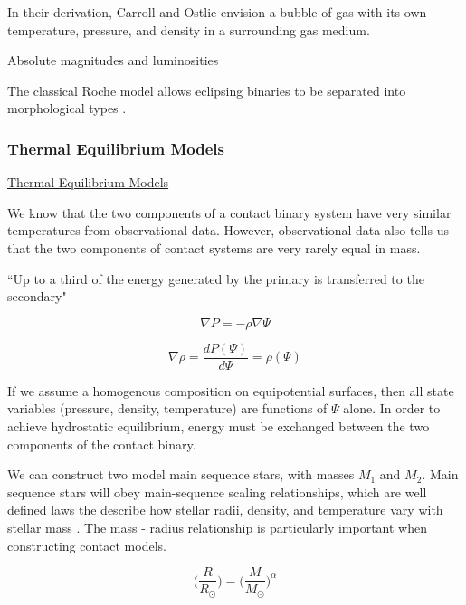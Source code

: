 \documentclass[12pt]{article} %
\numberwithin{equation}{section} %
\begin{document}
In their derivation, Carroll and Ostlie envision a bubble of gas with its own temperature, pressure, and density in a surrounding gas medium. 

Absolute magnitudes and luminosities \citep{rucinski1997absolute} \citep{rucinski2006luminosity}

The classical Roche model allows eclipsing binaries to be separated into morphological types \citep{terrell2001eclipsing}.


\subsubsection{Thermal Equilibrium Models}{\hyperlink{toc}{Thermal Equilibrium Models}} \label{sec: Thermal Equilibrium Models}

We know that the two components of a contact binary system have very similar temperatures from observational data. However, observational data also tells us that the two components of contact systems are very rarely equal in mass.

``Up to a third of the energy generated by the primary is transferred to the secondary"\citep{mochnacki1981contact}

\begin{equation} \label{eqn: equilibrium1}
\nabla P = - \rho \nabla \Psi
\end{equation}

\begin{equation} \label{eqn: equilibrium2}
\nabla \rho = \frac{dP(\Psi)}{d\Psi} = \rho(\Psi)
\end{equation}

If we assume a homogenous composition on equipotential surfaces, then all state variables (pressure, density, temperature) are functions of $\Psi$ alone. In order to achieve hydrostatic equilibrium, energy must be exchanged between the two components of the contact binary.

We can construct two model main sequence stars, with masses $M_{1}$ and $M_{2}$. Main sequence stars will obey main-sequence scaling relationships, which are well defined laws the describe how stellar radii, density, and temperature vary with stellar mass \citep{kippenhahn1990stellar}. The mass - radius relationship is particularly important when constructing contact models. 

\begin{equation} \label{eqn: mass_radius}
 \bigg( \frac{R}{R_{\odot}} \bigg) = \bigg( \frac{M}{M_{\odot}} \bigg)^{\alpha}
\end{equation}
\end{document}
